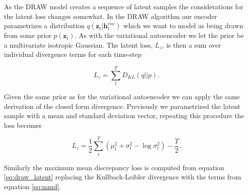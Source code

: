 As the DRAW model creates a sequence of latent samples the considerations for the latent loss changes somewhat. In the DRAW algorithm our encoder parametrizes a distribution $q(\mathbf{z}_t | \mathbf{h}_t^{enc})$ which we want to model as being drawn from some prior $p(\mathbf{z}_t)$. As with the variational autoencoder we let the prior be a multivariate isotropic Gaussian. The latent loss, $L_z$, is then a sum over individual divergence terms for each time-step

\begin{equation}\label{eq:draw_latent}
L_z = \sum_t^T D_{KL}(q||p).
\end{equation}

\noindent Given the same prior as for the variational autoencoder we can apply the same derivation of the closed form divergence. Previously we parametrized the latent sample with a mean and standard deviation vector, repeating this procedure the loss becomes 

\begin{equation}\label{eq:draw_kl}
L_z = \frac{1}{2}\sum_t^T(\mu^2_t + \sigma^2_t - \log \sigma_t ^2) - \frac{T}{2}.
\end{equation}

\noindent Similarly the maximum mean discrepancy loss is computed from equation \ref{eq:draw_latent} replacing the Kullback-Leibler divergence with the terms from equation \ref{eq:mmd}.
